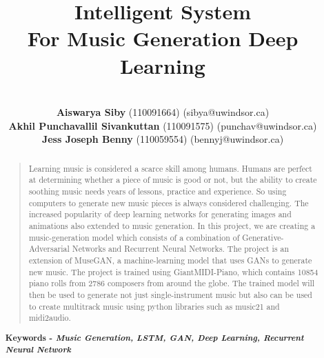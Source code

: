 \documentclass[letterpaper]{article}
\begin{document}
%
\title{Intelligent System \\For Music Generation Deep Learning {}}
\author{\\
\textbf{Aiswarya Siby} (110091664)  (sibya@uwindsor.ca)\\
\textbf{Akhil Punchavallil Sivankuttan}  (110091575) 
 (punchav@uwindsor.ca)\\
\textbf{Jess Joseph Benny}  (110059554)  (bennyj@uwindsor.ca)\\
}
\maketitle
\begin{abstract}
\begin{quote}
Learning music is considered a scarce skill among humans. Humans are perfect at determining whether a piece of music is good or not, but the ability to create soothing music needs years of lessons, practice and experience. So using computers to generate new music pieces is always considered challenging. The increased popularity of deep learning networks for generating images and animations also extended to music generation. In this project, we are creating a music-generation model which consists of a combination of Generative-Adversarial Networks and Recurrent Neural Networks. The project is an extension of MuseGAN, a machine-learning model that uses GANs to generate new music. The project is trained using GiantMIDI-Piano, which contains 10854 piano rolls from 2786 composers from around the globe. The trained model will then be used to generate not just single-instrument music but also can be used to create multitrack music using python libraries such as music21 and midi2audio. 
\end{quote}
\textbf{Keywords - \textit{Music Generation, LSTM, GAN, Deep Learning, Recurrent Neural Network}}
\end{abstract}
\end{document}
